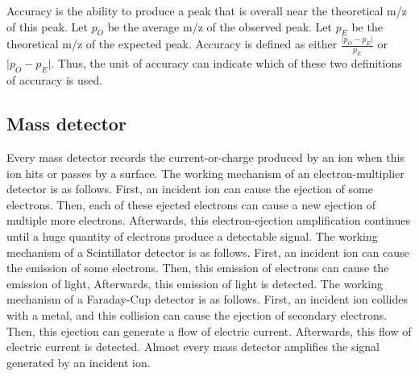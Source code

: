 Accuracy is the ability to produce a peak that is overall near the theoretical \gls{m/z} of this peak. 
Let \({p_O}\) be the average \gls{m/z} of the observed peak.
Let \({p_E}\) be the theoretical \gls{m/z} of the expected peak.
Accuracy is defined as either \(\frac{\lvert{p_O} - {p_E}\rvert}{p_E}\) or \(\lvert{p_O} - {p_E}\rvert\). 
Thus, the unit of accuracy can indicate which of these two definitions of accuracy is used.


\subsection{Mass detector} 
\label{subsec:fund2:MS:detector}

Every mass detector records the current-or-charge produced by an ion when this ion hits or passes by a surface.
The working mechanism of an electron-multiplier detector is as follows.
First, an incident ion can cause the ejection of some electrons.
Then, each of these ejected electrons can cause a new ejection of multiple more electrons.
Afterwards, this electron-ejection amplification continues until a huge quantity of electrons produce a detectable signal.
The working mechanism of a Scintillator detector is as follows.
First, an incident ion can cause the emission of some electrons.
Then, this emission of electrons can cause the emission of light, 
Afterwards, this emission of light is detected.
The working mechanism of a Faraday-Cup detector is as follows.          
First, an incident ion collides with a metal, and this collision can cause the ejection of secondary electrons.
Then, this ejection can generate a flow of electric current. %
Afterwards, this flow of electric current is detected.
Almost every mass detector amplifies the signal generated by an incident ion.

\section{\texorpdfstring{}{MS/MS}} %
\label{sec:MS:MSMS}
 

